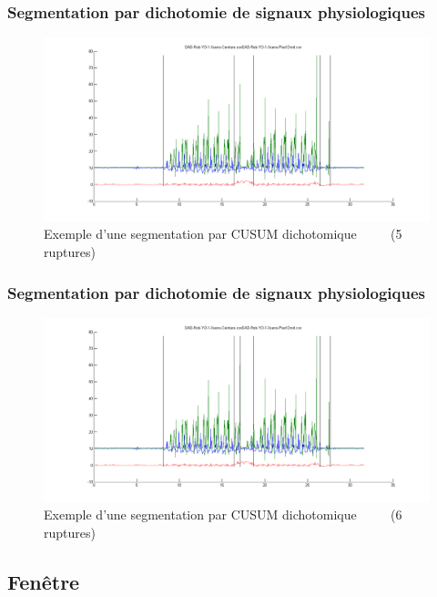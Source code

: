 \documentclass{beamer}
\begin{document}
\begin{frame}
	\frametitle{Segmentation par dichotomie de signaux physiologiques}
	\begin{figure}
		\includegraphics[scale=0.3]{dikt-seg5.png}
		\caption{Exemple d'une segmentation par CUSUM dichotomique
		~~~~
		(5 ruptures)}
	\end{figure}
\end{frame}

\begin{frame}
	\frametitle{Segmentation par dichotomie de signaux physiologiques}
	\begin{figure}
		\includegraphics[scale=0.3]{dikt-seg6.png}
		\caption{Exemple d'une segmentation par CUSUM dichotomique
		~~~~
		(6 ruptures)}
	\end{figure}
\end{frame}


\subsection{Fenêtre}
\end{document}
